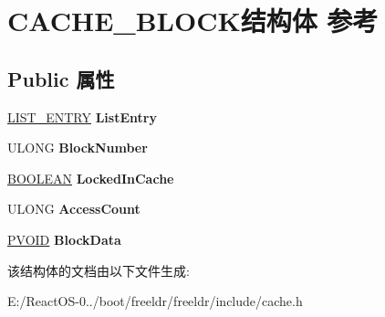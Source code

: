 \hypertarget{struct_c_a_c_h_e___b_l_o_c_k}{}\section{C\+A\+C\+H\+E\+\_\+\+B\+L\+O\+C\+K结构体 参考}
\label{struct_c_a_c_h_e___b_l_o_c_k}
\subsection*{Public 属性}
\begin{DoxyCompactItemize}
\item 
\mbox{\label{struct_c_a_c_h_e___b_l_o_c_k_a11b6690359576089dd1acecaed8172cf}} 
\hyperlink{struct___l_i_s_t___e_n_t_r_y}{L\+I\+S\+T\+\_\+\+E\+N\+T\+RY} {\bfseries List\+Entry}
\item 
\mbox{\label{struct_c_a_c_h_e___b_l_o_c_k_a56fa514bcf797d10811e7462f85f051c}} 
U\+L\+O\+NG {\bfseries Block\+Number}
\item 
\mbox{\label{struct_c_a_c_h_e___b_l_o_c_k_a2c5125ebb28b20b494a3a3d1969b1f69}} 
\hyperlink{_processor_bind_8h_a112e3146cb38b6ee95e64d85842e380a}{B\+O\+O\+L\+E\+AN} {\bfseries Locked\+In\+Cache}
\item 
\mbox{\label{struct_c_a_c_h_e___b_l_o_c_k_aff9d5ce0788e1de8ee05f123b29bd675}} 
U\+L\+O\+NG {\bfseries Access\+Count}
\item 
\mbox{\label{struct_c_a_c_h_e___b_l_o_c_k_a847b7906d23642a4be615ff7b59b8c55}} 
\hyperlink{interfacevoid}{P\+V\+O\+ID} {\bfseries Block\+Data}
\end{DoxyCompactItemize}


该结构体的文档由以下文件生成\+:\begin{DoxyCompactItemize}
\item 
E\+:/\+React\+O\+S-\/0../boot/freeldr/freeldr/include/cache.\+h\end{DoxyCompactItemize}

